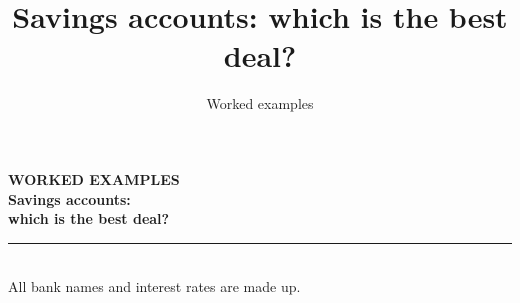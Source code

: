 \documentclass[aspectratio=169,12pt]{beamer}
\title{Savings accounts: which is the best deal?}
\subtitle{Worked examples}
\date{}
\begin{document}
\begin{frame}[plain]
  \vfill
  \hspace*{6mm}%
  \begin{minipage}{0.86\textwidth}
    {\color{inkmuted}\small\bfseries WORKED EXAMPLES}\\[3mm]
    {\color{slidehead}\fontsize{24}{28}\selectfont\bfseries
     Savings accounts:\\which is the best deal?}\\[4mm]
    \textcolor{slidehead!75}{\rule{28mm}{2.2pt}}\\[4mm]
    {\color{inkmuted}\small All bank names and interest rates are made up.}
  \end{minipage}
  \vfill
\end{frame}

\end{document}
